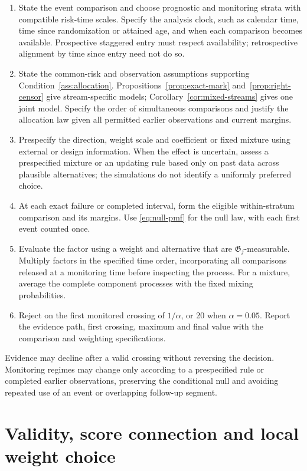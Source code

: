 \documentclass[12pt]{article}
\theoremstyle{definition}
\theoremstyle{remark}
\begin{document}
\begin{enumerate}[label=\textbf{Step \arabic*.},leftmargin=2.4cm]
\item State the event comparison and choose prognostic and monitoring strata with compatible risk-time scales. Specify the analysis clock, such as calendar time, time since randomization or attained age, and when each comparison becomes available. Prospective staggered entry must respect availability; retrospective alignment by time since entry need not do so.
\item State the common-risk and observation assumptions supporting Condition~\ref{ass:allocation}. Propositions~\ref{prop:exact-mark} and~\ref{prop:right-censor} give stream-specific models; Corollary~\ref{cor:mixed-streams} gives one joint model. Specify the order of simultaneous comparisons and justify the allocation law given all permitted earlier observations and current margins.
\item Prespecify the direction, weight scale and coefficient or fixed mixture using external or design information. When the effect is uncertain, assess a prespecified mixture or an updating rule based only on past data across plausible alternatives; the simulations do not identify a uniformly preferred choice.
\item At each exact failure or completed interval, form the eligible within-stratum comparison and its margins. Use \eqref{eq:null-pmf} for the null law, with each first event counted once.
\item Evaluate the factor using a weight and alternative that are $\mathfrak G_j$-measurable. Multiply factors in the specified time order, incorporating all comparisons released at a monitoring time before inspecting the process. For a mixture, average the complete component processes with the fixed mixing probabilities.
\item Reject on the first monitored crossing of $1/\alpha$, or 20 when $\alpha=0.05$. Report the evidence path, first crossing, maximum and final value with the comparison and weighting specifications.
\end{enumerate}
Evidence may decline after a valid crossing without reversing the decision. Monitoring regimes may change only according to a prespecified rule or completed earlier observations, preserving the conditional null and avoiding repeated use of an event or overlapping follow-up segment.

\section{Validity, score connection and local weight choice}
\label{sec:theory}
\end{document}
